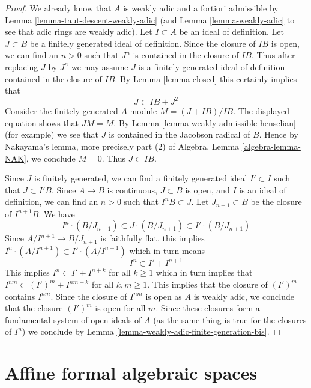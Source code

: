\documentclass{stacks-project}
\theoremstyle{plain}
\theoremstyle{definition}
\theoremstyle{remark}
\numberwithin{equation}{subsection}
\begin{document}
\begin{proof}
We already know that $A$ is weakly adic and a fortiori admissible by
Lemma \ref{lemma-taut-descent-weakly-adic}
(and Lemma \ref{lemma-weakly-adic} to see that adic rings are weakly adic).
Let $I \subset A$ be an ideal of definition.
Let $J \subset B$ be a finitely generated ideal of definition.
Since the closure of $IB$ is open, we can find an $n > 0$ such that
$J^n$ is contained in the closure of $IB$. Thus after replacing $J$
by $J^n$ we may assume $J$ is a finitely generated ideal
of definition contained in the closure of $IB$. By Lemma \ref{lemma-closed}
this certainly implies that
$$
J \subset IB + J^2
$$
Consider the finitely generated $A$-module $M = (J + IB)/IB$.
The displayed equation shows that $JM = M$.
By Lemma \ref{lemma-weakly-admissible-henselian} (for example)
we see that $J$ is contained in the Jacobson radical of $B$.
Hence by Nakayama's lemma, more precisely part (2) of
Algebra, Lemma \ref{algebra-lemma-NAK}, we conclude $M = 0$.
Thus $J \subset IB$.

\medskip\noindent
Since $J$ is finitely generated, we can find a finitely generated
ideal $I' \subset I$ such that $J \subset I'B$.
Since $A \to B$ is continuous, $J \subset B$ is open, and
$I$ is an ideal of definition, we can find an $n > 0$ such that
$I^nB \subset J$. Let $J_{n + 1} \subset B$ be the closure of
$I^{n + 1}B$.
We have
$$
I^n \cdot (B/J_{n + 1}) \subset J \cdot (B/J_{n + 1}) \subset
I' \cdot (B/J_{n + 1})
$$
Since $A/I^{n + 1} \to B/J_{n + 1}$ is faithfully flat, this
implies $I^n \cdot (A/I^{n + 1}) \subset I' \cdot (A/I^{n + 1})$
which in turn means
$$
I^n \subset I' + I^{n + 1}
$$
This implies $I^n \subset I'  + I^{n + k}$ for all $k \geq 1$
which in turn implies that $I^{nm} \subset (I')^m + I^{nm + k}$
for all $k, m \geq 1$. This implies that the closure of
$(I')^m$ contains $I^{nm}$. Since the closure of $I^{nm}$ is open
as $A$ is weakly adic,
we conclude that the closure $(I')^m$ is open for all $m$.
Since these closures form a fundamental system of open ideals
of $A$ (as the same thing is true for the closures of $I^n$)
we conclude by Lemma \ref{lemma-weakly-adic-finite-generation-bis}.
\end{proof}









\section{Affine formal algebraic spaces}
\label{section-affine-formal-algebraic-spaces}
\end{document}
